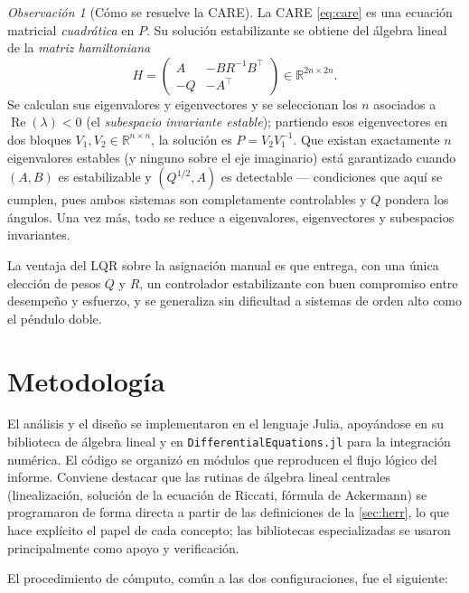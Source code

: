 \documentclass[11pt,letterpaper]{article}
\theoremstyle{definition}
\theoremstyle{plain}
\theoremstyle{remark}
\newtheorem{observacion}[definicion]{Observación}
\DeclareMathOperator{\Real}{Re}
\newcommand{\R}{\mathbb{R}}
\begin{document}
\begin{observacion}[Cómo se resuelve la CARE]
\label{obs:hamilton}
La CARE \cref{eq:care} es una ecuación matricial \emph{cuadrática} en
$P$. Su solución estabilizante se obtiene del álgebra lineal de la
\emph{matriz hamiltoniana}
\begin{equation}\label{eq:hamilton}
  H=\begin{pmatrix}A & -BR^{-1}B^\top\\ -Q & -A^\top\end{pmatrix}
   \in\R^{2n\times 2n}.
\end{equation}
Se calculan sus eigenvalores y eigenvectores y se seleccionan los $n$
asociados a $\Real(\lambda)<0$ (el \emph{subespacio invariante estable});
partiendo esos eigenvectores en dos bloques $V_1,V_2\in\R^{n\times n}$, la
solución es $P=V_2V_1^{-1}$. Que existan exactamente $n$ eigenvalores
estables (y ninguno sobre el eje imaginario) está garantizado cuando
$(A,B)$ es estabilizable y $(Q^{1/2},A)$ es detectable --- condiciones que
aquí se cumplen, pues ambos sistemas son completamente controlables y $Q$
pondera los ángulos. Una vez más, todo se
reduce a eigenvalores, eigenvectores y subespacios invariantes.
\end{observacion}

La ventaja del LQR sobre la asignación manual es que entrega, con una
única elección de pesos $Q$ y $R$, un controlador estabilizante con buen
compromiso entre desempeño y esfuerzo, y se generaliza sin dificultad a
sistemas de orden alto como el péndulo doble.

\section{Metodología}
\label{sec:metodo}

El análisis y el diseño se implementaron en el lenguaje Julia, apoyándose
en su biblioteca de álgebra lineal y en \texttt{DifferentialEquations.jl}
para la integración numérica. El código se organizó en módulos que
reproducen el flujo lógico del informe. Conviene destacar que las rutinas
de álgebra lineal centrales (linealización, solución de la ecuación de
Riccati, fórmula de Ackermann) se programaron de forma directa a partir
de las definiciones de la \cref{sec:herr}, lo que hace explícito el papel
de cada concepto; las bibliotecas especializadas se usaron principalmente
como apoyo y verificación.

El procedimiento de cómputo, común a las dos configuraciones, fue el
siguiente:
\end{document}
